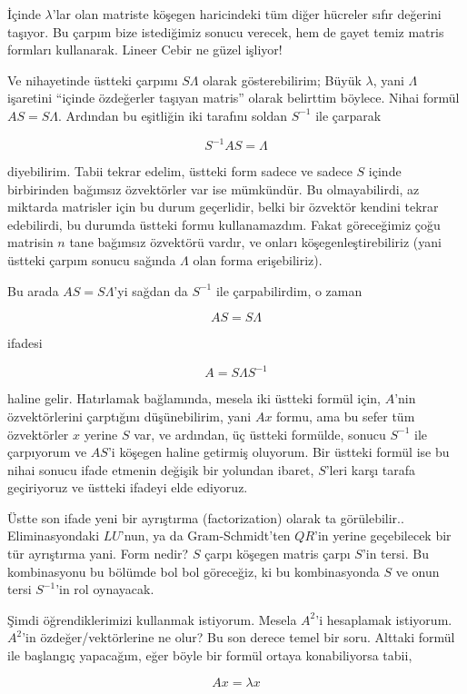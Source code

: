 \documentclass[12pt,fleqn]{article}\usepackage{../../common}
\begin{document}
İçinde $\lambda$'lar olan matriste köşegen haricindeki tüm diğer hücreler
sıfır değerini taşıyor. Bu çarpım bize istediğimiz sonucu verecek, hem de
gayet temiz matris formları kullanarak. Lineer Cebir ne güzel işliyor! 

Ve nihayetinde üstteki çarpımı $S\Lambda$ olarak gösterebilirim; Büyük
$\lambda$, yani $\Lambda$ işaretini ``içinde özdeğerler taşıyan matris''
olarak belirttim böylece. Nihai formül $AS = S\Lambda$. Ardından bu
eşitliğin iki tarafını soldan $S^{-1}$ ile çarparak

$$
S^{-1}AS = \Lambda
$$

diyebilirim. Tabii tekrar edelim, üstteki form sadece ve sadece $S$ içinde
birbirinden bağımsız özvektörler var ise mümkündür. Bu olmayabilirdi, az
miktarda matrisler için bu durum geçerlidir, belki bir özvektör kendini
tekrar edebilirdi, bu durumda üstteki formu kullanamazdım. Fakat
göreceğimiz çoğu matrisin $n$ tane bağımsız özvektörü vardır, ve onları
köşegenleştirebiliriz (yani üstteki çarpım sonucu sağında $\Lambda$ olan
forma erişebiliriz).

Bu arada $AS=S\Lambda$'yi sağdan da $S^{-1}$ ile çarpabilirdim, o zaman 

$$
AS=S\Lambda
$$

ifadesi

$$
A = S \Lambda S^{-1}
$$

haline gelir. Hatırlamak bağlamında, mesela iki üstteki formül için,
$A$'nin özvektörlerini çarptığını düşünebilirim, yani $Ax$ formu, ama bu
sefer tüm özvektörler $x$ yerine $S$ var, ve ardından, üç üstteki formülde,
sonucu $S^{-1}$ ile çarpıyorum ve $AS$'i köşegen haline getirmiş
oluyorum. Bir üstteki formül ise bu nihai sonucu ifade etmenin değişik bir
yolundan ibaret, $S$'leri karşı tarafa geçiriyoruz ve üstteki ifadeyi elde
ediyoruz.

Üstte son ifade yeni bir ayrıştırma (factorization) olarak ta
görülebilir.. Eliminasyondaki $LU$'nun, ya da Gram-Schmidt'ten $QR$'in
yerine geçebilecek bir tür ayrıştırma yani. Form nedir? $S$ çarpı köşegen
matris çarpı $S$'in tersi. Bu kombinasyonu bu bölümde bol bol göreceğiz, ki
bu kombinasyonda $S$ ve onun tersi $S^{-1}$'in rol oynayacak.

Şimdi öğrendiklerimizi kullanmak istiyorum. Mesela $A^2$'i hesaplamak
istiyorum. $A^2$'in özdeğer/vektörlerine ne olur? Bu son derece temel bir
soru. Alttaki formül ile başlangıç yapacağım, eğer böyle bir formül ortaya
konabiliyorsa tabii, 

$$ Ax = \lambda x $$
\end{document}
